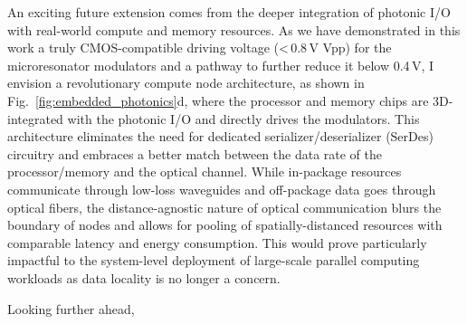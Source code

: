 An exciting future extension comes from the deeper integration of photonic I/O with real-world compute and memory resources. As we have demonstrated in this work a truly CMOS-compatible driving voltage (<\,0.8\,V Vpp) for the microresonator modulators and a pathway to further reduce it below 0.4\,V, I envision a revolutionary compute node architecture, as shown in Fig.~\ref{fig:embedded_photonics}d, where the processor and memory chips are 3D-integrated with the photonic I/O and directly drives the modulators. This architecture eliminates the need for dedicated serializer/deserializer (SerDes) circuitry and embraces a better match between the data rate of the processor/memory and the optical channel. While in-package resources communicate through low-loss waveguides and off-package data goes through optical fibers, the distance-agnostic nature of optical communication blurs the boundary of nodes and allows for pooling of spatially-distanced resources with comparable latency and energy consumption. This would prove particularly impactful to the system-level deployment of large-scale parallel computing workloads as data locality is no longer a concern.

Looking further ahead,